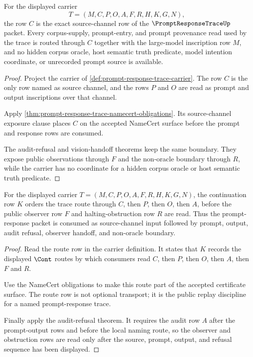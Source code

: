\begin{theorem}
\label{thm:prompt-response-trace-source-channel-exactness}
For the displayed carrier
$$
T=(M,C,P,O,A,F,R,H,K,G,N),
$$
the row $C$ is the exact source-channel row of the $\PromptResponseTraceUp$ packet. Every corpus-supply, prompt-entry, and prompt provenance read used by the trace is routed through $C$ together with the large-model inscription row $M$, and no hidden corpus oracle, host semantic truth predicate, model intention coordinate, or unrecorded prompt source is available.
\end{theorem}
\begin{proof}
Project the carrier of \autoref{def:prompt-response-trace-carrier}. The row $C$ is the only row named as source channel, and the rows $P$ and $O$ are read as prompt and output inscriptions over that channel.

Apply \autoref{thm:prompt-response-trace-namecert-obligations}. Its source-channel exposure clause places $C$ on the accepted NameCert surface before the prompt and response rows are consumed.

The audit-refusal and vision-handoff theorems keep the same boundary. They expose public observations through $F$ and the non-oracle boundary through $R$, while the carrier has no coordinate for a hidden corpus oracle or host semantic truth predicate.
\end{proof}

\begin{theorem}
\label{thm:prompt-response-trace-prompt-output-route-order}
For the displayed carrier $T=(M,C,P,O,A,F,R,H,K,G,N)$, the continuation row $K$ orders the trace route through $C$, then $P$, then $O$, then $A$, before the public observer row $F$ and halting-obstruction row $R$ are read. Thus the prompt-response packet is consumed as source-channel input followed by prompt, output, audit refusal, observer handoff, and non-oracle boundary.
\end{theorem}
\begin{proof}
Read the route row in the carrier definition. It states that $K$ records the displayed $\Cont$ routes by which consumers read $C$, then $P$, then $O$, then $A$, then $F$ and $R$.

Use the NameCert obligations to make this route part of the accepted certificate surface. The route row is not optional transport; it is the public replay discipline for a named prompt-response trace.

Finally apply the audit-refusal theorem. It requires the audit row $A$ after the prompt-output rows and before the local naming route, so the observer and obstruction rows are read only after the source, prompt, output, and refusal sequence has been displayed.
\end{proof}

